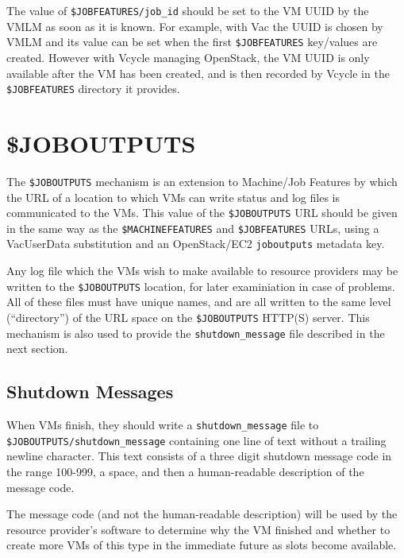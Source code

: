 \documentclass[12pt,a4paper]{article}
\begin{document}
The value of \texttt{\$JOBFEATURES/job\_id} should be set to the VM UUID by
the VMLM as soon as it is known. For example, with Vac the UUID is
chosen by VMLM and its value can be set when the first
\texttt{\$JOBFEATURES}
key/values are created. However with Vcycle managing OpenStack, the
VM UUID is only available after the VM has been created, and is then
recorded by Vcycle in the \texttt{\$JOBFEATURES} directory it provides.

\section{\$JOBOUTPUTS}
\label{sec:joboutputs}

The \texttt{\$JOBOUTPUTS} mechanism is an extension to Machine/Job Features by
which the URL of a location to which VMs can write status and log files
is communicated to the VMs. This value of the \texttt{\$JOBOUTPUTS} URL should
be given in the same way as the \texttt{\$MACHINEFEATURES} and 
\texttt{\$JOBFEATURES} URLs, using a VacUserData substitution and an
OpenStack/EC2 \texttt{joboutputs} metadata key. 

Any log file which the VMs wish to make available to resource providers
may be written to the \texttt{\$JOBOUTPUTS} location, for later examiniation
in case of problems. All of these files must have unique names, and
are all written to the same level (``directory'') of the URL
space on the \texttt{\$JOBOUTPUTS} HTTP(S) server. This mechanism is also used 
to provide the \texttt{shutdown\_message} file described in the next section.

\subsection{Shutdown Messages}
\label{sec:shutdownmessages}

When VMs finish, they should write a \texttt{shutdown\_message} file to
\texttt{\$JOBOUTPUTS/shutdown\_message} containing one line of text without
a trailing newline character. This text consists of a
three digit shutdown message code in the range 100-999, a space, 
and then a human-readable description of the message code. 

The message code (and not the human-readable description) will
be used by the resource provider's software to determine why
the VM finished and whether to create more VMs of this type in
the immediate future as slots become available.
\end{document}
